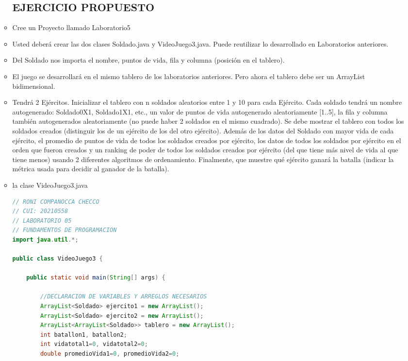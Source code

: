 \documentclass{article}
\begin{document}
\begin{itemize}
\begin{itemize}
        \subsection{EJERCICIO PROPUESTO}
        \item Cree un Proyecto llamado Laboratorio5
        \item Usted deberá crear las dos clases Soldado.java y VideoJuego3.java. Puede reutilizar lo desarrollado en Laboratorios anteriores.
        \item Del Soldado nos importa el nombre, puntos de vida, fila y columna (posición en el tablero).
        \item El juego se desarrollará en el mismo tablero de los laboratorios anteriores. Pero ahora el tablero debe ser un ArrayList bidimensional.
        \item Tendrá 2 Ejércitos. Inicializar el tablero con n soldados aleatorios entre 1 y 10 para cada Ejército. Cada soldado tendrá un nombre autogenerado: Soldado0X1, Soldado1X1, etc., un valor de puntos de vida autogenerado aleatoriamente [1..5], la fila y columna también autogenerados aleatoriamente (no puede haber 2 soldados en el mismo cuadrado). Se debe mostrar el tablero con todos los soldados creados (distinguir los de un ejército de los del otro ejército). Además de los datos del Soldado con mayor vida de cada ejército, el promedio de puntos de vida de todos los soldados creados por ejército, los datos de todos los soldados por ejército en el orden que fueron creados y un ranking de poder de todos los soldados creados por ejército (del que tiene más nivel de vida al que tiene menos) usando 2 diferentes algoritmos de ordenamiento. Finalmente, que muestre qué ejército ganará la batalla (indicar la métrica usada para decidir al ganador de la batalla).
        
        \item la clase VideoJuego3.java        
        \begin{lstlisting}[language=java]
// RONI COMPANOCCA CHECCO
// CUI: 20210558
// LABORATORIO 05
// FUNDAMENTOS DE PROGRAMACION 
import java.util.*;

public class VideoJuego3 {

	public static void main(String[] args) {

		//DECLARACION DE VARIABLES Y ARREGLOS NECESARIOS
		ArrayList<Soldado> ejercito1 = new ArrayList();
		ArrayList<Soldado> ejercito2 = new ArrayList();
		ArrayList<ArrayList<Soldado>> tablero = new ArrayList();
		int batallon1, batallon2;
		int vidatotal1=0, vidatotal2=0;
		double promedioVida1=0, promedioVida2=0;


\end{lstlisting}
\end{itemize}
\end{itemize}
\end{document}
